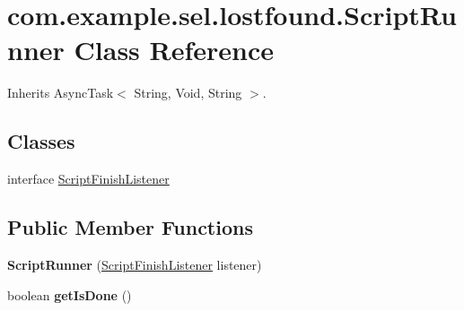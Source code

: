 \hypertarget{classcom_1_1example_1_1sel_1_1lostfound_1_1ScriptRunner}{\section{com.\-example.\-sel.\-lostfound.\-Script\-Runner \-Class \-Reference}
\label{classcom_1_1example_1_1sel_1_1lostfound_1_1ScriptRunner}
}


\-Inherits \-Async\-Task$<$ String, Void, String $>$.

\subsection*{\-Classes}
\begin{DoxyCompactItemize}
\item 
interface \hyperlink{interfacecom_1_1example_1_1sel_1_1lostfound_1_1ScriptRunner_1_1ScriptFinishListener}{\-Script\-Finish\-Listener}
\end{DoxyCompactItemize}
\subsection*{\-Public \-Member \-Functions}
\begin{DoxyCompactItemize}
\item 
\hypertarget{classcom_1_1example_1_1sel_1_1lostfound_1_1ScriptRunner_a89fe364ebf708a526d2271b2aaad65dc}{{\bfseries \-Script\-Runner} (\hyperlink{interfacecom_1_1example_1_1sel_1_1lostfound_1_1ScriptRunner_1_1ScriptFinishListener}{\-Script\-Finish\-Listener} listener)}\label{classcom_1_1example_1_1sel_1_1lostfound_1_1ScriptRunner_a89fe364ebf708a526d2271b2aaad65dc}

\item 
\hypertarget{classcom_1_1example_1_1sel_1_1lostfound_1_1ScriptRunner_a9f6500f6f9fda5c4230dbbba9724b8bd}{boolean {\bfseries get\-Is\-Done} ()}\label{classcom_1_1example_1_1sel_1_1lostfound_1_1ScriptRunner_a9f6500f6f9fda5c4230dbbba9724b8bd}

\end{DoxyCompactItemize}
